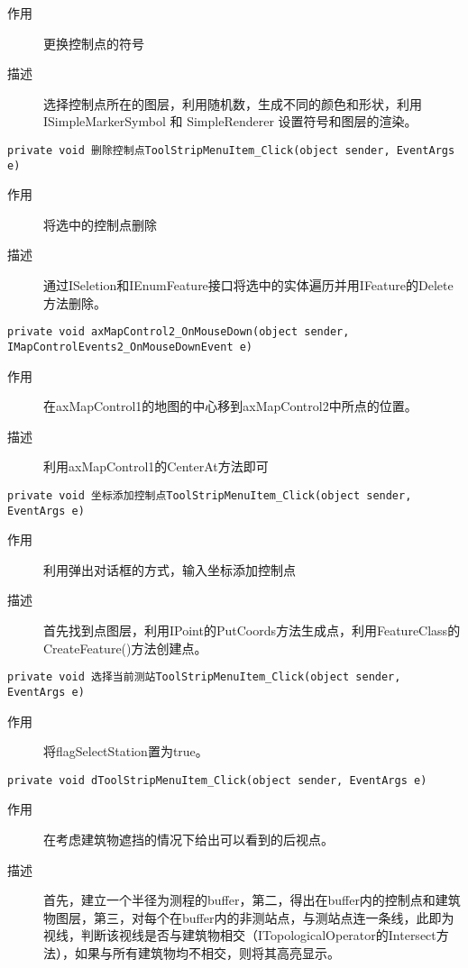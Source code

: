 \documentclass[twoside,color=blue,mathpazo,titlestyle=hang,12pt]{elegantbook}
\numberwithin{equation}{section}
\begin{document}
\begin{description}
\item[作用] 更换控制点的符号
\item[描述] 选择控制点所在的图层，利用随机数，生成不同的颜色和形状，利用ISimpleMarkerSymbol 和 SimpleRenderer 设置符号和图层的渲染。
\end{description}
\begin{lstlisting}
private void 删除控制点ToolStripMenuItem_Click(object sender, EventArgs e)
\end{lstlisting}
\begin{description}
\item[作用] 将选中的控制点删除
\item[描述] 通过ISeletion和IEnumFeature接口将选中的实体遍历并用IFeature的Delete方法删除。
\end{description}
\begin{lstlisting}
private void axMapControl2_OnMouseDown(object sender, IMapControlEvents2_OnMouseDownEvent e)
\end{lstlisting}
\begin{description}
\item[作用] 在axMapControl1的地图的中心移到axMapControl2中所点的位置。
\item[描述] 利用axMapControl1的CenterAt方法即可
\end{description}
\begin{lstlisting}
private void 坐标添加控制点ToolStripMenuItem_Click(object sender, EventArgs e)
\end{lstlisting}
\begin{description}
\item[作用] 利用弹出对话框的方式，输入坐标添加控制点
\item[描述] 首先找到点图层，利用IPoint的PutCoords方法生成点，利用FeatureClass的CreateFeature()方法创建点。
\end{description}
\begin{lstlisting}
private void 选择当前测站ToolStripMenuItem_Click(object sender, EventArgs e)
\end{lstlisting}
\begin{description}
\item[作用] 将flagSelectStation置为true。
\end{description}
\begin{lstlisting}
private void dToolStripMenuItem_Click(object sender, EventArgs e)
\end{lstlisting}
\begin{description}
\item[作用] 在考虑建筑物遮挡的情况下给出可以看到的后视点。
\item[描述] 首先，建立一个半径为测程的buffer，第二，得出在buffer内的控制点和建筑物图层，第三，对每个在buffer内的非测站点，与测站点连一条线，此即为视线，判断该视线是否与建筑物相交（ITopologicalOperator的Intersect方法），如果与所有建筑物均不相交，则将其高亮显示。
\end{description}
\end{document}
